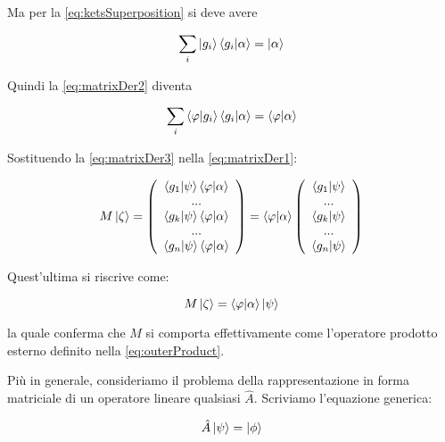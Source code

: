 Ma per la \eqref{eq:ketsSuperposition} si deve avere

	\begin{equation}
		\sum_i \ket{g_i} \braket{g_i}{\alpha} = \ket{\alpha}
	\end{equation}

Quindi la \eqref{eq:matrixDer2} diventa

	\begin{equation} \label{eq:matrixDer3}
		\sum_i \braket{\varphi}{g_i} \braket{g_i}{\alpha} = \braket{\varphi}{\alpha}
	\end{equation}

Sostituendo la \eqref{eq:matrixDer3} nella \eqref{eq:matrixDer1}:

	\begin{equation}
			M \ket{\zeta} = \left ( \begin{array}{c}
				\braket{g_1}{\psi} \braket{\varphi}{\alpha} \\
				... \\
				\braket{g_k}{\psi} \braket{\varphi}{\alpha} \\
				... \\
				\braket{g_n}{\psi} \braket{\varphi}{\alpha} \\
			\end{array}
		\right ) = \braket{\varphi}{\alpha} \left ( \begin{array}{c}
				\braket{g_1}{\psi} \\
				... \\
				\braket{g_k}{\psi} \\
				... \\
				\braket{g_n}{\psi} \\
			\end{array}
		\right )
	\end{equation}

Quest'ultima si riscrive come:

	\begin{equation}
		M \ket{\zeta} = \braket{\varphi}{\alpha} \ket{\psi}
	\end{equation}

la quale conferma che $M$ si comporta effettivamente come l'operatore prodotto esterno definito nella \eqref{eq:outerProduct}.

Più in generale, consideriamo il problema della rappresentazione in forma matriciale di un operatore lineare qualsiasi $\hat{A}$. Scriviamo l'equazione generica:

	\begin{equation} \label{eq:operatorGeneric}
		\hat{A} \ket{\psi} = \ket{\phi}
	\end{equation}

